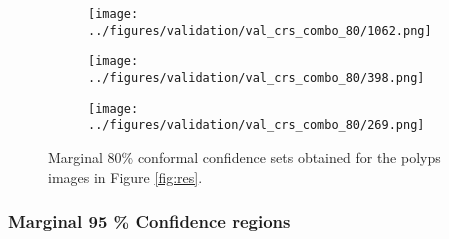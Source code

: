 \begin{figure}[h!]
\begin{subfigure}{0.18\textwidth}
		\label{fig:1}
	\end{subfigure}
	\begin{subfigure}{0.18\textwidth}
		\centering
		\texttt{[image: ../figures/validation/val\_crs\_combo\_80/1062.png]}
		\label{fig:1}
	\end{subfigure}
	\begin{subfigure}{0.18\textwidth}
		\centering
		\texttt{[image: ../figures/validation/val\_crs\_combo\_80/398.png]}
		\label{fig:1}
	\end{subfigure}
	\begin{subfigure}{0.18\textwidth}
		\centering
		\texttt{[image: ../figures/validation/val\_crs\_combo\_80/269.png]}
		\label{fig:1}
	\end{subfigure}
	\label{fig:grid}
	\caption{Marginal 80\% conformal confidence sets obtained for the polyps images in Figure \ref{fig:res}.}\label{fig:joint2}
\end{figure}
\subsubsection{Marginal 95 \% Confidence regions}


